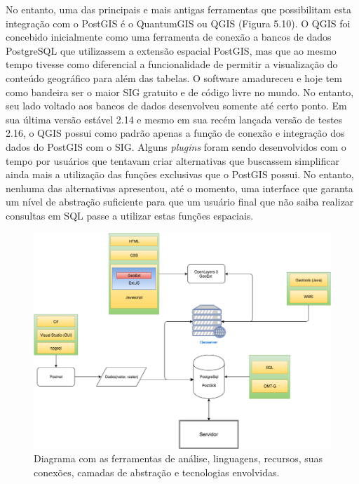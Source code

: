 No entanto, uma das principais e mais antigas ferramentas que possibilitam esta integração com o PostGIS é o QuantumGIS ou QGIS (Figura 5.10). O QGIS foi concebido inicialmente como uma ferramenta de conexão a bancos de dados PostgreSQL que utilizassem a extensão espacial PostGIS, mas que ao mesmo tempo tivesse como diferencial a funcionalidade de permitir a visualização do conteúdo geográfico para além das tabelas. O software amadureceu e hoje tem como bandeira ser o maior SIG gratuito e de código livre no mundo. No entanto, seu lado voltado aos bancos de dados desenvolveu somente até certo ponto. Em sua última versão estável 2.14 e mesmo em sua recém lançada versão de testes 2.16, o QGIS possui como padrão apenas a função de conexão e integração dos dados do PostGIS com o SIG. Alguns \textit{plugins} foram sendo desenvolvidos com o tempo por usuários que tentavam criar alternativas que buscassem simplificar ainda mais a utilização das funções exclusivas que o PostGIS possui. No entanto, nenhuma das alternativas apresentou, até o momento, uma interface que garanta um nível de abstração suficiente para que um usuário final que não saiba realizar consultas em SQL passe a utilizar estas funções espaciais.	

	\begin{figure}
		\centering
		\includegraphics[width=1\linewidth]{data/diagrama}
		\caption{Diagrama com as ferramentas de análise, linguagens, recursos, suas conexões, camadas de abstração e tecnologias envolvidas.}
		\label{fig:diagrama}
	\end{figure}
	

